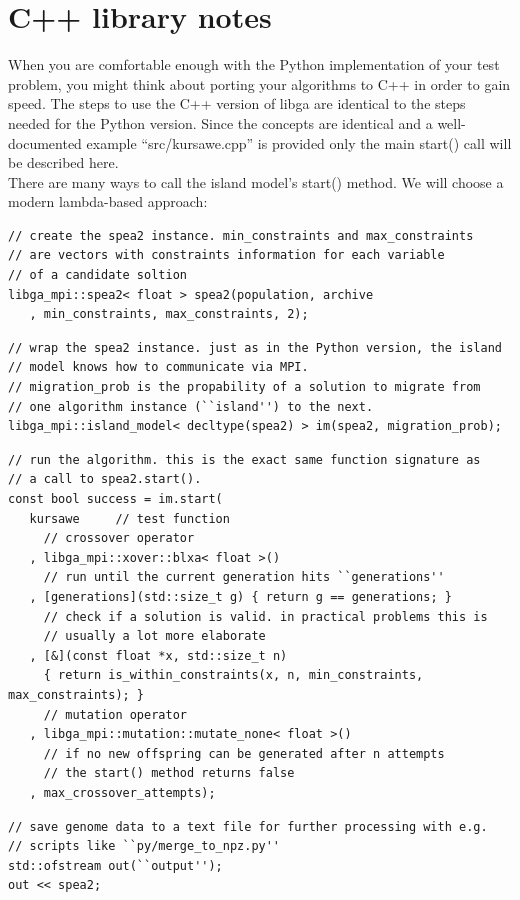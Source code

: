 \documentclass[12pt]{article}
\begin{document}
\section{C++ library notes}
When you are comfortable enough with the Python implementation of your test problem, you might think about porting your algorithms to C++ in order to gain speed. The steps to use the C++ version of libga are identical to the steps needed for the Python version. Since the concepts are identical and a well-documented example ``src/kursawe.cpp'' is provided only the main start() call will be described here. \\
There are many ways to call the island model's start() method. We will choose a modern lambda-based approach: 
\begin{lstlisting}[style=C++]
// create the spea2 instance. min_constraints and max_constraints 
// are vectors with constraints information for each variable
// of a candidate soltion
libga_mpi::spea2< float > spea2(population, archive
   , min_constraints, max_constraints, 2); 
\end{lstlisting}
\begin{lstlisting}[style=C++]
// wrap the spea2 instance. just as in the Python version, the island
// model knows how to communicate via MPI. 
// migration_prob is the propability of a solution to migrate from 
// one algorithm instance (``island'') to the next. 
libga_mpi::island_model< decltype(spea2) > im(spea2, migration_prob); 
\end{lstlisting}
\begin{lstlisting}[style=C++]
// run the algorithm. this is the exact same function signature as
// a call to spea2.start(). 
const bool success = im.start(
   kursawe     // test function 
     // crossover operator
   , libga_mpi::xover::blxa< float >()
     // run until the current generation hits ``generations''
   , [generations](std::size_t g) { return g == generations; }
     // check if a solution is valid. in practical problems this is 
     // usually a lot more elaborate
   , [&](const float *x, std::size_t n) 
     { return is_within_constraints(x, n, min_constraints, max_constraints); }
     // mutation operator
   , libga_mpi::mutation::mutate_none< float >() 
     // if no new offspring can be generated after n attempts
     // the start() method returns false
   , max_crossover_attempts); 
\end{lstlisting}
\begin{lstlisting}[style=C++]
// save genome data to a text file for further processing with e.g. 
// scripts like ``py/merge_to_npz.py''
std::ofstream out(``output''); 
out << spea2; 
\end{lstlisting}




\end{document}
